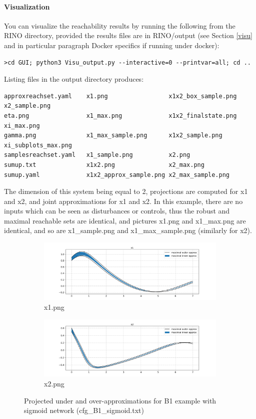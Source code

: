 \documentclass{article}
\begin{document}
\paragraph{Visualization}
You can visualize the  reachability results by running the following  from the RINO directory, provided the results files are in RINO/output (see Section \ref{visu} and in particular paragraph Docker specifics if running under docker):
\begin{verbatim}
>cd GUI; python3 Visu_output.py --interactive=0 --printvar=all; cd ..
\end{verbatim}
Listing files in the output directory produces:
\small
\begin{verbatim}
approxreachset.yaml    x1.png                 x1x2_box_sample.png    x2_sample.png
eta.png                x1_max.png             x1x2_finalstate.png    xi_max.png
gamma.png              x1_max_sample.png      x1x2_sample.png        xi_subplots_max.png
samplesreachset.yaml   x1_sample.png          x2.png
sumup.txt              x1x2.png               x2_max.png
sumup.yaml             x1x2_approx_sample.png x2_max_sample.png

\end{verbatim}
\normalsize
The dimension of this system being equal to 2,  projections are computed for x1 and x2, and joint approximations for x1 and x2. 
In this example,   there are no inputs which can be seen as disturbances or controls,  thus the robust and maximal reachable sets are identical, and pictures x1.png  and x1\_max.png are identical, and so are x1\_sample.png  and x1\_max\_sample.png (similarly for x2).

\begin{figure}
\centering
\begin{subfigure}{.5\textwidth}
  \centering
  \includegraphics[width=.99\linewidth]{x1_B1sig.png}
  \caption{x1.png}
  \label{fig:sub1}
\end{subfigure}%
\begin{subfigure}{.5\textwidth}
  \centering
  \includegraphics[width=.99\linewidth]{x2_B1sig.png}
  \caption{x2.png}
  \label{fig:sub2}
\end{subfigure}
\caption{Projected under and over-approximations for B1 example with sigmoid network (cfg\_B1\_sigmoid.txt)}
\label{fig:test}
\end{figure}
\end{document}

